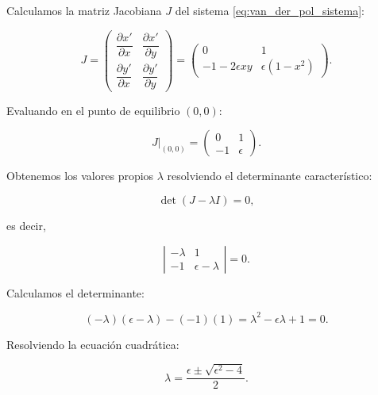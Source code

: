 Calculamos la matriz Jacobiana \( J \) del sistema \eqref{eq:van_der_pol_sistema}:

\begin{equation}
    J = 
    \begin{pmatrix}
        \dfrac{\partial x'}{\partial x} & \dfrac{\partial x'}{\partial y} \\
        \dfrac{\partial y'}{\partial x} & \dfrac{\partial y'}{\partial y}
    \end{pmatrix}
    =
    \begin{pmatrix}
        0 & 1 \\
        -1 - 2\epsilon x y & \epsilon (1 - x^2)
    \end{pmatrix}.
\end{equation}

Evaluando en el punto de equilibrio \((0, 0)\):

\begin{equation}
    J|_{(0,0)} = 
    \begin{pmatrix}
        0 & 1 \\
        -1 & \epsilon
    \end{pmatrix}.
\end{equation}

Obtenemos los valores propios \(\lambda\) resolviendo el determinante característico:

\begin{equation}
    \det(J - \lambda I) = 0,
\end{equation}

es decir,

\begin{equation}
    \left| \begin{array}{cc}
        -\lambda & 1 \\
        -1 & \epsilon - \lambda
    \end{array} \right| = 0.
\end{equation}

Calculamos el determinante:

\begin{equation}
    (-\lambda)(\epsilon - \lambda) - (-1)(1) = \lambda^2 - \epsilon \lambda + 1 = 0.
\end{equation}

Resolviendo la ecuación cuadrática:

\begin{equation}
    \lambda = \frac{\epsilon \pm \sqrt{\epsilon^2 - 4}}{2}.
\end{equation}

